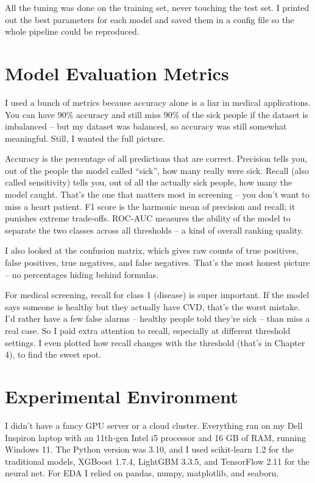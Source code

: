 \documentclass[11pt, a4paper, oneside]{book}
\begin{document}
All the tuning was done on the training set, never touching the test set. I printed out the best parameters for each model and saved them in a config file so the whole pipeline could be reproduced.

\section{Model Evaluation Metrics}
I used a bunch of metrics because accuracy alone is a liar in medical applications. You can have 90\% accuracy and still miss 90\% of the sick people if the dataset is imbalanced – but my dataset was balanced, so accuracy was still somewhat meaningful. Still, I wanted the full picture.

Accuracy is the percentage of all predictions that are correct. Precision tells you, out of the people the model called “sick”, how many really were sick. Recall (also called sensitivity) tells you, out of all the actually sick people, how many the model caught. That's the one that matters most in screening – you don't want to miss a heart patient. F1 score is the harmonic mean of precision and recall; it punishes extreme trade‑offs. ROC‑AUC measures the ability of the model to separate the two classes across all thresholds – a kind of overall ranking quality.

I also looked at the confusion matrix, which gives raw counts of true positives, false positives, true negatives, and false negatives. That's the most honest picture – no percentages hiding behind formulas.

For medical screening, recall for class 1 (disease) is super important. If the model says someone is healthy but they actually have CVD, that's the worst mistake. I'd rather have a few false alarms – healthy people told they're sick – than miss a real case. So I paid extra attention to recall, especially at different threshold settings. I even plotted how recall changes with the threshold (that’s in Chapter 4), to find the sweet spot.

\section{Experimental Environment}
I didn't have a fancy GPU server or a cloud cluster. Everything ran on my Dell Inspiron laptop with an 11th‑gen Intel i5 processor and 16 GB of RAM, running Windows 11. The Python version was 3.10, and I used scikit‑learn 1.2 for the traditional models, XGBoost 1.7.4, LightGBM 3.3.5, and TensorFlow 2.11 for the neural net. For EDA I relied on pandas, numpy, matplotlib, and seaborn.
\end{document}
